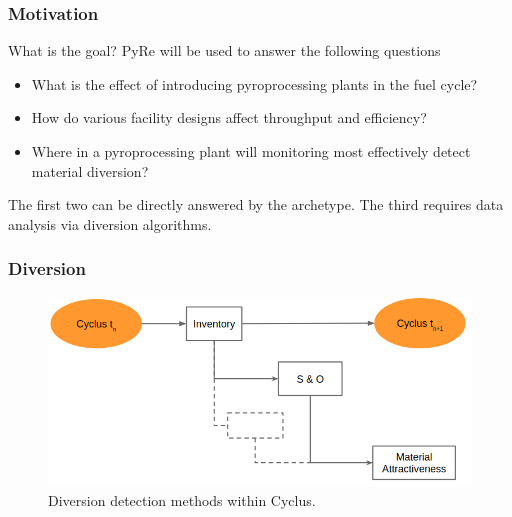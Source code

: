 \begin{frame}
  \frametitle{Motivation}
 \begin{block}{What is the goal?}
 	PyRe will be used to answer the following questions
 	\begin{itemize}
 		\item What is the effect of introducing pyroprocessing plants in the fuel cycle?
 		\item How do various facility designs affect throughput and efficiency?
 		\item Where in a pyroprocessing plant will monitoring most 
 		effectively detect material diversion?
 	\end{itemize}
\end{block}
The first two can be directly answered by the archetype. The third requires data analysis via
diversion algorithms.	
\end{frame}

\begin{frame}
  \frametitle{Diversion}
        \begin{figure}
        	\centering
        	\includegraphics[width=0.9\linewidth]{diversion1}
        	\caption{Diversion detection methods within Cyclus.}
        \end{figure}
\end{frame}
